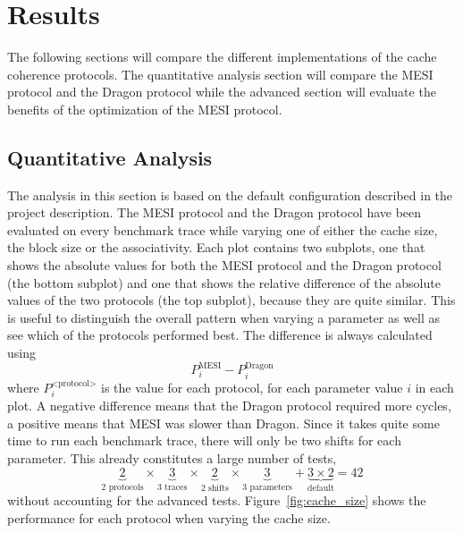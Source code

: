 \section{Results}
The following sections will compare the different implementations of the cache
coherence protocols. The quantitative analysis section will compare the MESI
protocol and the Dragon protocol while the advanced section will evaluate the
benefits of the optimization of the MESI protocol.

\subsection{Quantitative Analysis}


The analysis in this section is based on the default configuration described in
the project description. The MESI protocol and the Dragon protocol have been evaluated
on every benchmark trace while varying one of either the cache size, the block
size or the associativity. Each plot contains two subplots, one that shows the
absolute values for both the MESI protocol and the Dragon protocol (the bottom
subplot) and one that shows the relative difference of the absolute values of
the two protocols (the top subplot), because they are quite similar. This is useful to
distinguish the overall pattern when varying a parameter as well as see which of
the protocols performed best. The difference is always calculated using
$$
    P^\text{MESI}_i - P^\text{Dragon}_i
$$
where $ P^\text{<protocol>}_i $ is the value for each protocol, for each
parameter value $i$ in each plot. A negative difference means that the Dragon protocol
required more cycles, a positive means that MESI was slower than Dragon.
Since it takes quite some time to run each
benchmark trace, there will only be two shifts for each parameter. This already
constitutes a large number of tests,
$$
    \underbrace{2}_\text{2 protocols} \times \underbrace{3}_\text{3 traces} \times \underbrace{2}_\text{2 shifts} \times \underbrace{3}_\text{3 parameters} + \underbrace{3 \times 2}_\text{default} = 42
$$
without accounting for the advanced tests. Figure~\ref{fig:cache_size} shows
the performance for each protocol when varying the cache size.


